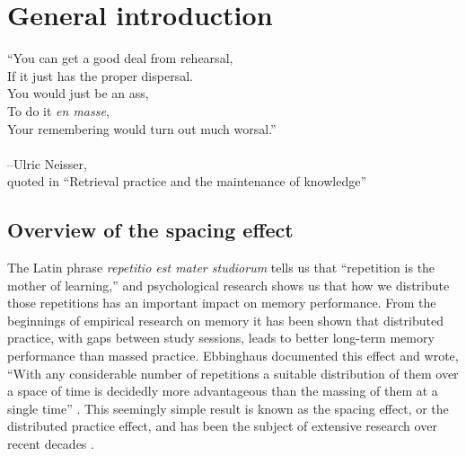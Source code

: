 

\chapter{General introduction}


\begin{center}
\singlespacing

\vspace{-1.5cm}

``You can get a good deal from rehearsal,\\
If it just has the proper dispersal.\\
You would just be an ass,\\
To do it \textit{en masse},\\
Your remembering would turn out much worsal.''\\
~\\
--Ulric Neisser,\\
{\small quoted in ``Retrieval practice and the maintenance of knowledge'' \cite{Bjor1988}}
\end{center}

\section{Overview of the spacing effect}


The Latin phrase \textit{repetitio est mater studiorum} tells us that ``repetition is the mother of learning,'' and psychological research shows us that how we distribute those repetitions has an important impact on memory performance.  From the beginnings of empirical research on memory it has been shown that distributed practice, with gaps between study sessions, leads to better long-term memory performance than massed practice.  Ebbinghaus documented this effect and wrote, ``With any considerable number of repetitions a suitable distribution of them over a space of time is decidedly more advantageous than the massing of them at a single time'' \cite[p.~89]{Ebbi1885}.  This seemingly simple result is known as the spacing effect, or the distributed practice effect, and has been the subject of extensive research over recent decades \cite<for reviews, see>{CepeEtal2006,CepeEtal2009,DelaEtal2010}.

